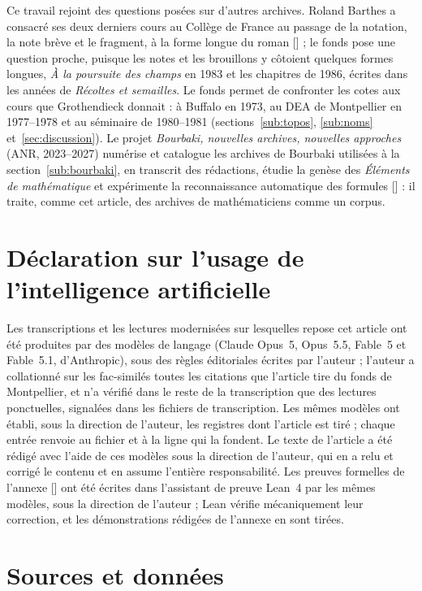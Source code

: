 \documentclass[11pt]{amsart}
\newcommand{\autocite}[1]{\citealp{hua2026#1}}
\begin{document}
Ce travail rejoint des questions posées sur d'autres archives. Roland Barthes a consacré ses deux derniers cours au Collège de France au passage de la notation, la note brève et le fragment, à la forme longue du roman [\citealp{barthes2003}] ; le fonds pose une question proche, puisque les notes et les brouillons y côtoient quelques formes longues, \emph{À la poursuite des champs} en 1983 et les chapitres de 1986, écrites dans les années de \emph{Récoltes et semailles}. Le fonds permet de confronter les cotes aux cours que Grothendieck donnait : à Buffalo en 1973, au DEA de Montpellier en 1977--1978 et au séminaire de 1980--1981 (sections~\ref{sub:topos}, \ref{sub:noms} et~\ref{sec:discussion}). Le projet \emph{Bourbaki, nouvelles archives, nouvelles approches} (ANR, 2023--2027) numérise et catalogue les archives de Bourbaki utilisées à la section~\ref{sub:bourbaki}, en transcrit des rédactions, étudie la genèse des \emph{Éléments de mathématique} et expérimente la reconnaissance automatique des formules [\citealp{banana}] : il traite, comme cet article, des archives de mathématiciens comme un corpus.

\section*{Déclaration sur l'usage de l'intelligence artificielle}

Les transcriptions et les lectures modernisées sur lesquelles repose cet article ont été produites par des modèles de langage (Claude Opus~5, Opus~5.5, Fable~5 et Fable~5.1, d'Anthropic), sous des règles éditoriales écrites par l'auteur ; l'auteur a collationné sur les fac-similés toutes les citations que l'article tire du fonds de Montpellier, et n'a vérifié dans le reste de la transcription que des lectures ponctuelles, signalées dans les fichiers de transcription. Les mêmes modèles ont établi, sous la direction de l'auteur, les registres dont l'article est tiré ; chaque entrée renvoie au fichier et à la ligne qui la fondent. Le texte de l'article a été rédigé avec l'aide de ces modèles sous la direction de l'auteur, qui en a relu et corrigé le contenu et en assume l'entière responsabilité. Les preuves formelles de l'annexe [\autocite{b}] ont été écrites dans l'assistant de preuve Lean~4 par les mêmes modèles, sous la direction de l'auteur ; Lean vérifie mécaniquement leur correction, et les démonstrations rédigées de l'annexe en sont tirées.

\section*{Sources et données}
\begingroup\sloppy
\end{document}
